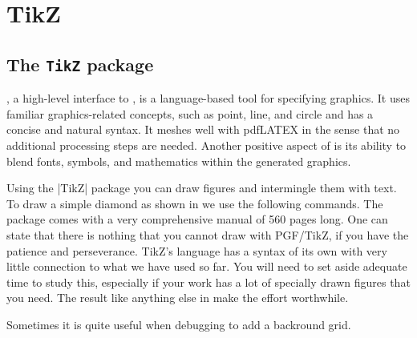 \newcommand\seepgfmanual[1]{%
    \textit{see} the PGFmanual page #1}%
    
\chapter{TikZ}

\section{The \protect\texttt{TikZ} package}
, a high-level interface to , is a language-based tool for specifying graphics.
It uses familiar graphics-related concepts, such as point, line, and circle and
has a concise and natural syntax. It meshes well with pdfLATEX in the sense that
no additional processing steps are needed. Another positive aspect of  is
its ability to blend \tex fonts, symbols, and mathematics within the generated
graphics.


Using the |TikZ| package you can draw figures and intermingle them with text. To draw a simple diamond as shown in  we use
the following commands. The package comes with a very comprehensive manual of 560 pages long. One can state that there is nothing that you cannot draw with PGF/TikZ, if you have the patience and perseverance. TikZ's language has a syntax of its own with very little connection to what we have used so far. You will need to set aside adequate time to study this, especially if your work has a lot of specially drawn figures that you need. The result like anything else in \tex make the effort worthwhile.


\begin{center}
\end{center}
\label{fig:diamond}



\begin{teXXX}
\end{teXXX}



Sometimes it is quite useful when debugging to add a backround grid. 


